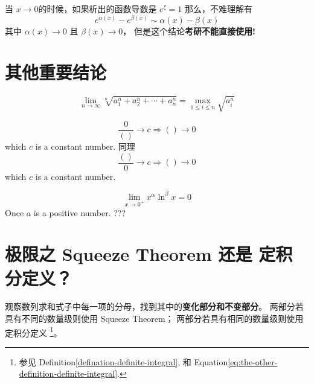 当 $x\to0$的时候，如果析出的函数导数是 $e^{\xi} = 1$ 那么，不难理解有
\begin{equation}
	e^{\alpha(x)} - e^{\beta(x)} \sim \alpha(x) - \beta(x)
\end{equation}
其中 $\alpha(x) \to 0$ 且 $\beta(x) \to 0$，
但是这个结论\textbf{考研不能直接使用!}

\section{其他重要结论}
\begin{lemma}
	\begin{equation}
		\lim_{n \to \infty} \sqrt[n]{a^{n}_{1} + a^{n}_{2} + 
        \cdots + a^{n}_{n}} = \max_{1\leq i \leq n}{\sqrt{a_{i}^{n}}}
	\end{equation}
\end{lemma}

\begin{lemma}
    \begin{equation}
        \frac{0}{()} \to c \Rightarrow () \to 0
    \end{equation}
    which $c$ is a constant number.
    同理
    \begin{equation}
        \frac{()}{0} \to c \Rightarrow () \to 0
    \end{equation}
    which $c$ is a constant number.
\end{lemma}

\begin{lemma}
    \[
        \lim_{x \to 0^+} x^{\alpha} \ln^{\beta}x = 0
    \]
    Once $a$ is a positive number. ??? %
\end{lemma}

\section{极限之 Squeeze Theorem 还是 定积分定义？}
\label{use-squeeze-or-definition-of-integral}

观察数列求和式子中每一项的分母，找到其中的\textbf{变化部分和不变部分}。
两部分若具有不同的数量级则使用 Squeeze Theorem；
两部分若具有相同的数量级则使用 定积分定义
\footnote{
    参见 Definition\ref{defination-definite-integral},
    和 Equation\ref{eq:the-other-definition-definite-integral}.
}。

